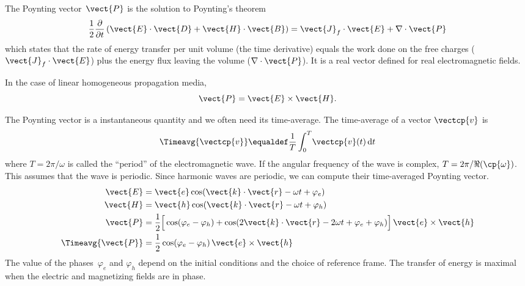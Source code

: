 The Poynting vector~$\vect{P}$ is the solution to Poynting's theorem
\begin{equation}
    \frac{1}{2}\frac{\partial}{\partial t}
    \left(
        \vect{E} \cdot \vect{D} + \vect{H} \cdot \vect{B}
    \right)
    =
    \vect{J}_f \cdot \vect{E}
    +
    \nabla \cdot \vect{P}
    \label{eq:poynting_theorem}
\end{equation}
which states that the rate of energy transfer per unit volume (the time derivative)
equals the work done on the free charges ($\vect{J}_f \cdot \vect{E}$)
plus the energy flux leaving the volume ($\nabla \cdot \vect{P}$).
It is a real vector defined for real electromagnetic fields.

In the case of linear homogeneous propagation media,
\begin{equation}
    \vect{P} = \vect{E} \times \vect{H}
    \text{.}
    \label{eq:poynting_vector}
\end{equation}

The Poynting vector is a instantaneous quantity and we often need its time-average.
The time-average of a vector $\vectcp{v}$ is
\begin{equation}
    \Timeavg{\vectcp{v}}
    \equaldef
    \frac{1}{T}
    \int_0^T \! \vectcp{v}(t)\, \mathrm{d}t
    \label{eq:def_time_average}
\end{equation}
where $T=2\pi/\omega$ is called the ``period'' of the electromagnetic wave.
If the angular frequency of the wave is complex, $T=2\pi/\Re(\cp{\omega})$.
This assumes that the wave is periodic.
Since harmonic waves are periodic, we can compute their time-averaged Poynting vector.
\begin{align}
    \vect{E} &= \vect{e} \cos(\vect{k}\cdot\vect{r} - \omega t + \varphi_e)
    \\
    \vect{H} &= \vect{h} \cos(\vect{k}\cdot\vect{r} - \omega t + \varphi_h)
    \\
    \vect{P} &=
    \frac{1}{2}
    \Big[
        \cos(\varphi_e - \varphi_h)
        +
        \cos(2\vect{k}\cdot\vect{r} - 2\omega t + \varphi_e + \varphi_h)
    \Big]
    \,
    \vect{e} \times \vect{h}
    \\
    \Timeavg{\vect{P}}
    &=
    \frac{1}{2} \cos(\varphi_e - \varphi_h) \, \vect{e} \times \vect{h}
\end{align}
The value of the phases~$\varphi_e$ and $\varphi_h$ depend on the initial conditions and the choice of reference frame.
The transfer of energy is maximal when the electric and magnetizing fields are in phase.

